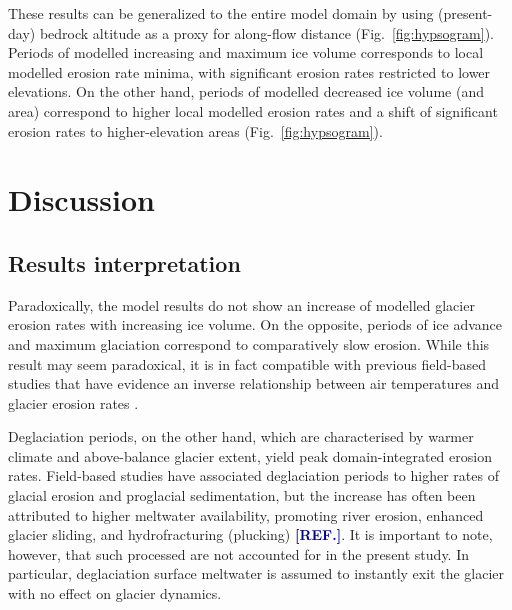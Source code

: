 \documentclass[utf8]{article}
\newcommand{\aref}[0]{\textcolor{darkblue}{\textbf{[REF.]}}}
\begin{document}
    These results can be generalized to the entire model domain by using
    (present-day) bedrock altitude as a proxy for along-flow distance
    (Fig.~\ref{fig:hypsogram}). Periods of modelled increasing and maximum ice
    volume corresponds to local modelled erosion rate minima, with significant
    erosion rates restricted to lower elevations. On the other hand, periods of
    modelled decreased ice volume (and area) correspond to higher local
    modelled erosion rates and a shift of significant erosion rates to
    higher-elevation areas (Fig.~\ref{fig:hypsogram}).


\section{Discussion}

\subsection{Results interpretation}

    Paradoxically, the model results do not show an increase of modelled
    glacier erosion rates with increasing ice volume.  On the opposite, periods
    of ice advance and maximum glaciation correspond to comparatively slow
    erosion. While this result may seem paradoxical, it is in fact
    compatible with previous field-based studies that have evidence an inverse
    relationship between air temperatures and glacier erosion rates
    \citep{Koppes.etal.2015, Cook.etal.2020}.

    Deglaciation periods, on the other hand, which are characterised by warmer
    climate and above-balance glacier extent, yield peak domain-integrated
    erosion rates. Field-based studies have associated deglaciation periods to
    higher rates of glacial erosion and proglacial sedimentation, but the increase
    has often been attributed to higher meltwater availability, promoting river
    erosion, enhanced glacier sliding, and hydrofracturing (plucking) \aref. It
    is important to note, however, that such processed are not accounted for in
    the present study. In particular, deglaciation surface meltwater is assumed
    to instantly exit the glacier with no effect on glacier dynamics.
\end{document}
